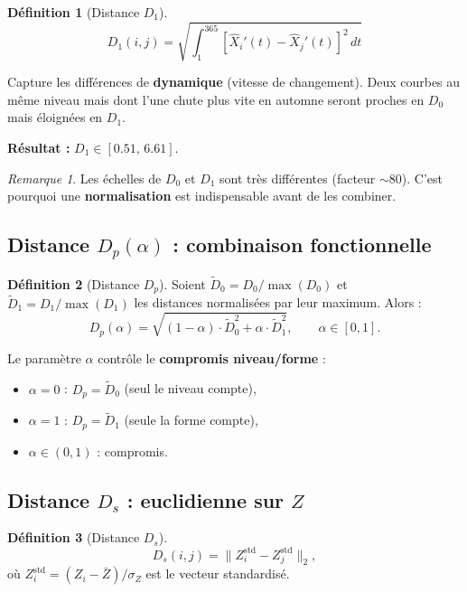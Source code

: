 \documentclass[11pt, a4paper]{article}
\newcommand{\Dp}{D_p}
\theoremstyle{definition}
\newtheorem{definition}{Définition}[section]
\theoremstyle{remark}
\newtheorem{remarque}{Remarque}[section]
\begin{document}
\begin{definition}[Distance $D_1$]
\[
  D_1(i,j) = \sqrt{\int_1^{365} [\hat{X}_i'(t) - \hat{X}_j'(t)]^2 \, dt}
\]
\end{definition}

Capture les différences de \textbf{dynamique} (vitesse de changement).
Deux courbes au même niveau mais dont l'une chute plus vite en automne
seront proches en $D_0$ mais éloignées en $D_1$.

\textbf{Résultat :} $D_1 \in [0.51, \, 6.61]$.

\begin{remarque}
Les échelles de $D_0$ et $D_1$ sont très différentes (facteur $\sim 80$).
C'est pourquoi une \textbf{normalisation} est indispensable avant de les
combiner.
\end{remarque}

\subsection{Distance $\Dp(\alpha)$ : combinaison fonctionnelle}

\begin{definition}[Distance $\Dp$]
Soient $\tilde{D}_0 = D_0 / \max(D_0)$ et $\tilde{D}_1 = D_1 / \max(D_1)$ les
distances normalisées par leur maximum. Alors :
\[
  \Dp(\alpha) = \sqrt{(1-\alpha) \cdot \tilde{D}_0^2 + \alpha \cdot \tilde{D}_1^2},
  \qquad \alpha \in [0, 1].
\]
\end{definition}

Le paramètre $\alpha$ contrôle le \textbf{compromis niveau/forme} :
\begin{itemize}[nosep]
  \item $\alpha = 0$ : $\Dp = \tilde{D}_0$ (seul le niveau compte),
  \item $\alpha = 1$ : $\Dp = \tilde{D}_1$ (seule la forme compte),
  \item $\alpha \in (0,1)$ : compromis.
\end{itemize}

\subsection{Distance $D_s$ : euclidienne sur $Z$}

\begin{definition}[Distance $D_s$]
\[
  D_s(i,j) = \| Z_i^{\text{std}} - Z_j^{\text{std}} \|_2,
\]
où $Z_i^{\text{std}} = (Z_i - \bar{Z}) / \sigma_Z$ est le vecteur standardisé.
\end{definition}
\end{document}
